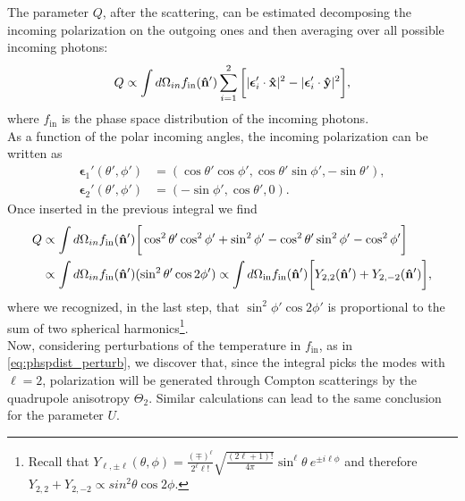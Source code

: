 The parameter $Q$, after the scattering, can be estimated decomposing the incoming polarization on the outgoing ones and then averaging over all possible incoming photons:
$$Q\propto\int d\Omega_{in} f_{\text{in}}(\mathbf{\hat{n}}')\sum_{i=1}^{2}\bigg[|\boldsymbol{\epsilon}_{i}'\cdot\mathbf{\hat{x}}|^2-|\boldsymbol{\epsilon}_{i}'\cdot\mathbf{\hat{y}}|^2\bigg],$$
where $f_{\text{in}}$ is the phase space distribution of the incoming photons.\\
As a function of the polar incoming angles, the incoming polarization can be written as
\begin{align*}
    \boldsymbol{\epsilon}_1'(\theta',\phi') &=(\cos\theta'\cos\phi',\cos\theta'\sin\phi',-\sin\theta'),\\
    \boldsymbol{\epsilon}_2'(\theta',\phi') &=(-\sin\phi',\cos\theta',0).
\end{align*} 
Once inserted in the previous integral we find
\begin{align*}
    Q&\propto\int d\Omega_{in} f_{\text{in}}(\mathbf{\hat{n}}')\bigg[\cos^2\theta'\cos^2\phi'+\sin^2\phi'-\cos^2\theta'\sin^2\phi'-\cos^2\phi'\bigg]\\&\propto\int d\Omega_{in} f_{\text{in}}(\mathbf{\hat{n}}')(\sin^2\theta'\cos2\phi')\propto\int d\Omega_{\text{in}}f_{\text{in}}(\mathbf{\hat{n}}')\bigg[Y_{2,2}(\mathbf{\hat{n}}')+Y_{2,-2}(\mathbf{\hat{n}}')\bigg],
\end{align*}
where we recognized, in the last step, that $\sin^2\phi'\cos2\phi'$ is proportional to the sum of two spherical harmonics\footnote{Recall that $Y_{\ell,\pm\ell}(\theta,\phi)=\frac{(\mp)^\ell}{2^\ell\ell!}\sqrt{\frac{(2\ell+1)!}{4\pi}}\sin^\ell\theta\ e^{\pm i\ell\phi}$ and therefore $Y_{2,2}+Y_{2,-2}\propto sin^2\theta\cos2\phi$.}.\\
Now, considering perturbations of the temperature in $f_{\text{in}}$, as in \eqref{eq:phspdist_perturb}, we discover that, since the integral picks the modes with $\ell=2$, polarization will be generated through Compton scatterings by the quadrupole anisotropy $\Theta_2$. Similar calculations can lead to the same conclusion for the parameter $U$.

